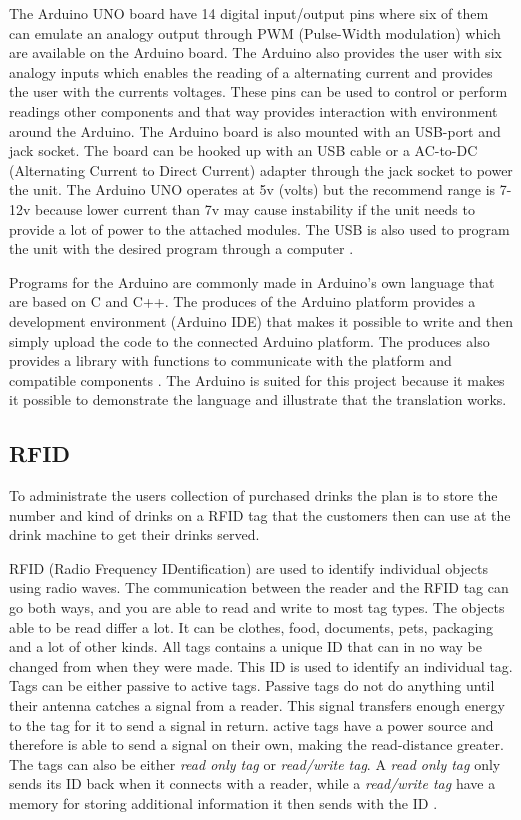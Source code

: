 The Arduino UNO board have 14 digital input/output pins where six of them can emulate an analogy output through PWM (Pulse-Width modulation) which are available on the Arduino board. The Arduino also provides the user with six analogy inputs which enables the reading of a alternating current and provides the user with the currents voltages. These pins can be used to control or perform readings other components and that way provides interaction with environment around the Arduino.
The Arduino board is also mounted with an USB-port and jack socket. The board can be hooked up with an USB cable or a AC-to-DC (Alternating Current to Direct Current) adapter through the jack socket to power the unit. The Arduino UNO operates at 5v (volts) but the recommend range is 7-12v because lower current than 7v may cause instability if the unit needs to provide a lot of power to the attached modules. The USB is also used to program the unit with the desired program through a computer \citep{ArduinoUno}.

Programs for the Arduino are commonly made in Arduino's own language that are based on C and C++. The produces of the Arduino platform provides a development environment (Arduino IDE) that makes it possible to write and then simply upload the code to the connected Arduino platform. The produces also provides a library with functions to communicate with the platform and compatible components \citep{ArduinoLanguage}.
The Arduino is suited for this project because it makes it possible to demonstrate the language and illustrate that the translation works. 

\subsection{RFID}
To administrate the users collection of purchased drinks the plan is to store the number and kind of drinks on a RFID tag that the customers then can use at the drink machine to get their drinks served.

RFID (Radio Frequency IDentification) are used to identify individual objects using radio waves.
The communication between the reader and the RFID tag can go both ways, and you are able to read and write to most tag types. 
The objects able to be read differ a lot. It can be clothes, food, documents, pets, packaging and a lot of other kinds. 
All tags contains a unique ID that can in no way be changed from when they were made. This ID is used to identify an individual tag.
Tags can be either passive to active tags. Passive tags do not do anything until their antenna catches a signal from a reader. This signal transfers enough energy to the tag for it to send a signal in return. active tags have a power source and therefore is able to send a signal on their own, making the read-distance greater.
The tags can also be either \textit{read only tag} or \textit{read/write tag}. A \textit{read only tag} only sends its ID back when it connects with a reader, while a \textit{read/write tag} have a memory for storing additional information it then sends with the ID \citep{RFID}.


